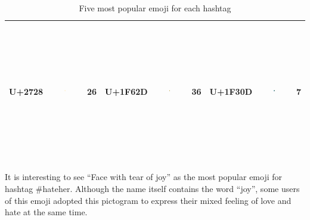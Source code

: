 \documentclass[]{article}
\begin{document}
\begin{table}[htbp]
\begin{tabular}{ccccccccc}
U+2728 & \includegraphics[width=0.03\textwidth, height=60mm]{images/U+2728.png} & 26 & U+1F62D &  \includegraphics[width=0.03\textwidth, height=60mm]{images/U+1F62D.png} & 36 & U+1F30D &   \includegraphics[width=0.03\textwidth, height=60mm]{images/U+1F30D.png} & 7 \\ 
   \hline
\end{tabular}
\caption{Five most popular emoji for each hashtag} 
\label{tab:EPopular}
\end{table}

It is interesting to see ``Face with tear of joy'' as the most popular
emoji for hashtag \#hateher. Although the name itself contains the word
``joy'', some users of this emoji adopted this pictogram to express
their mixed feeling of love and hate at the same time.
\end{document}
